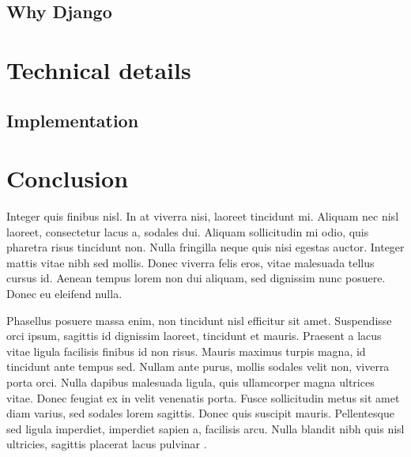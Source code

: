 \documentclass[12pt,a4paper,oneside,article]{memoir}
\numberwithin{equation}{chapter}
\begin{document}
\subsection{Why Django}
\label{sec:creation-django}

\section{Technical details}
\label{sec:technical-details}

\subsection{Implementation}
\label{sec:implementation}

\section{Conclusion}
\label{sec:conclusion}
Integer quis finibus nisl. In at viverra nisi, laoreet tincidunt mi. Aliquam nec
nisl laoreet, consectetur lacus a, sodales dui. Aliquam sollicitudin mi odio,
quis pharetra risus tincidunt non. Nulla fringilla neque quis nisi egestas
auctor. Integer mattis vitae nibh sed mollis. Donec viverra felis eros, vitae
malesuada tellus cursus id. Aenean tempus lorem non dui aliquam, sed dignissim
nunc posuere. Donec eu eleifend nulla.

Phasellus posuere massa enim, non tincidunt nisl efficitur sit amet. Suspendisse
orci ipsum, sagittis id dignissim laoreet, tincidunt et mauris. Praesent a lacus
vitae ligula facilisis finibus id non risus. Mauris maximus turpis magna, id
tincidunt ante tempus sed. Nullam ante purus, mollis sodales velit non, viverra
porta orci. Nulla dapibus malesuada ligula, quis ullamcorper magna ultrices
vitae. Donec feugiat ex in velit venenatis porta. Fusce sollicitudin metus sit
amet diam varius, sed sodales lorem sagittis. Donec quis suscipit mauris.
Pellentesque sed ligula imperdiet, imperdiet sapien a, facilisis arcu. Nulla
blandit nibh quis nisl ultricies, sagittis placerat lacus pulvinar
\cite{munroe2014Automation}.

\clearpage{}
\renewcommand*{\UrlFont}{\footnotesize\ttfamily}
\printbibliography
\end{document}
